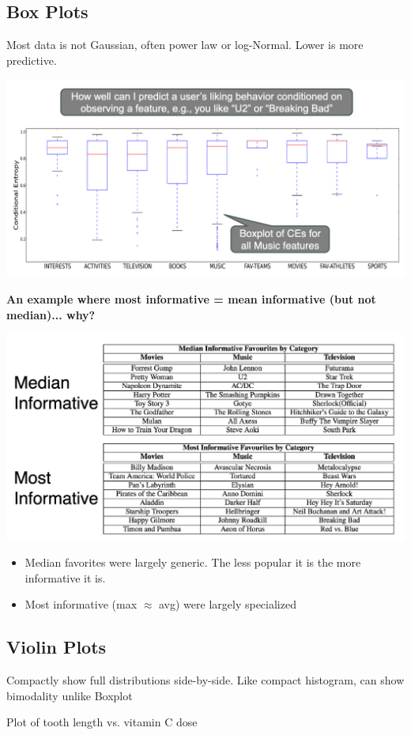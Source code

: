\documentclass[11pt]{article}
\theoremstyle{definition}
\begin{document}
\subsection{Box Plots}
Most data is not Gaussian, often power law or log-Normal. Lower is more predictive.

\includegraphics[width=\textwidth]{21.png}

\textbf{An example where most informative = mean
informative (but not median)... why?}

\includegraphics[width=\textwidth]{22.png}
\begin{itemize}
  \item Median favorites were largely generic. The less popular it is the more informative it is.
  \item Most informative (max $\approx$ avg) were largely specialized
\end{itemize}
\subsection{Violin Plots}
Compactly show full distributions side-by-side. Like compact histogram, can show bimodality unlike Boxplot

Plot of tooth length vs. vitamin C dose
\end{document}
